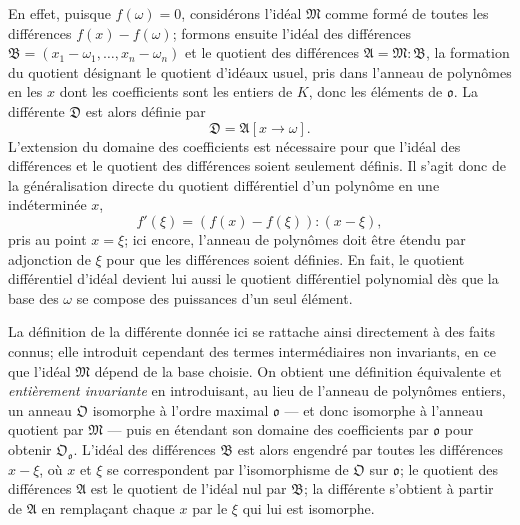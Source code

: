 En effet, puisque \(f(\omega)=0\), considérons l'idéal \(\mathfrak M\) comme formé de toutes les différences \(f(x)-f(\omega)\); formons ensuite l'idéal des différences \(\mathfrak B=(x_1-\omega_1,\ldots,x_n-\omega_n)\) et le quotient des différences \(\mathfrak A=\mathfrak M:\mathfrak B\), la formation du quotient désignant le quotient d'idéaux usuel, pris dans l'anneau de polynômes en les \(x\) dont les coefficients sont les entiers de \(K\), donc les éléments de \(\mathfrak o\). La différente \(\mathfrak D\) est alors définie par
\[
\mathfrak D=\mathfrak A[x\to\omega].
\]
L'extension du domaine des coefficients est nécessaire pour que l'idéal des différences et le quotient des différences soient seulement définis. Il s'agit donc de la généralisation directe du quotient différentiel d'un polynôme en une indéterminée \(x\),
\[
f'(\xi)=(f(x)-f(\xi)):(x-\xi),
\]
pris au point \(x=\xi\); ici encore, l'anneau de polynômes doit être étendu par adjonction de \(\xi\) pour que les différences soient définies. En fait, le quotient différentiel d'idéal devient lui aussi le quotient différentiel polynomial dès que la base des \(\omega\) se compose des puissances d'un seul élément.

La définition de la différente donnée ici se rattache ainsi directement à des faits connus; elle introduit cependant des termes intermédiaires non invariants, en ce que l'idéal \(\mathfrak M\) dépend de la base choisie. On obtient une définition équivalente et \emph{entièrement invariante} en introduisant, au lieu de l'anneau de polynômes entiers, un anneau \(\mathfrak O\) isomorphe à l'ordre maximal \(\mathfrak o\) --- et donc isomorphe à l'anneau quotient par \(\mathfrak M\) --- puis en étendant son domaine des coefficients par \(\mathfrak o\) pour obtenir \(\mathfrak O_{\mathfrak o}\). L'idéal des différences \(\mathfrak B\) est alors engendré par toutes les différences \(x-\xi\), où \(x\) et \(\xi\) se correspondent par l'isomorphisme de \(\mathfrak O\) sur \(\mathfrak o\); le quotient des différences \(\mathfrak A\) est le quotient de l'idéal nul par \(\mathfrak B\); la différente s'obtient à partir de \(\mathfrak A\) en remplaçant chaque \(x\) par le \(\xi\) qui lui est isomorphe.

